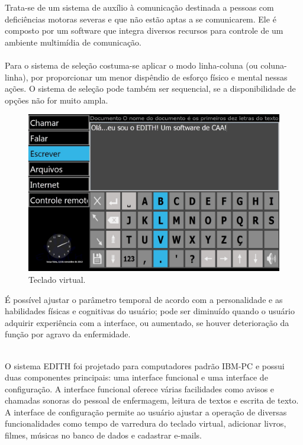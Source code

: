 \documentclass[twoside]{article}
\begin{document}
\begin{multicols}{2}
\noindent Trata-se de um sistema de auxílio à comunicação destinada a pessoas com deficiências motoras severas e que não estão aptas a se comunicarem. Ele é composto por um software que integra diversos recursos para controle de um ambiente multimídia de comunicação. 
\noindent \\\\Para o sistema de seleção costuma-se aplicar o modo linha-coluna (ou coluna-linha), por proporcionar um menor dispêndio de esforço físico e mental nessas ações. O sistema de seleção pode também ser sequencial, se a disponibilidade de opções não for muito ampla. 

\begin{figure}[H]
\label{fig:edith_tecladovirtual}
  \caption{Teclado virtual.}
  \centering
    \includegraphics[scale = 0.19]{edith_tecladovirtual.png}
\end{figure}

\noindent É possível ajustar o parâmetro temporal de acordo com a personalidade e as habilidades físicas e cognitivas do usuário; pode ser diminuído quando o usuário adquirir experiência com a interface, ou aumentado, se houver deterioração da função por agravo da enfermidade. 

\noindent \\O sistema EDITH foi projetado para computadores padrão IBM-PC e possui duas componentes principais: uma interface funcional e uma interface de configuração. A interface funcional oferece várias facilidades como avisos e chamadas sonoras do pessoal de enfermagem, leitura de textos e escrita de texto. A interface de configuração permite ao usuário ajustar a operação de diversas funcionalidades como tempo de varredura do teclado virtual, adicionar livros, filmes, músicas no banco de dados e cadastrar e-mails.


\end{multicols}
\end{document}
